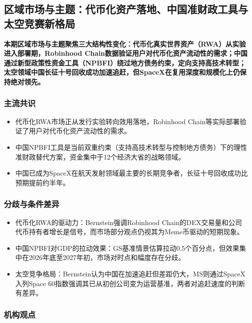 \documentclass[11pt]{ctexart}
\begin{document}
\subsection{区域市场与主题：代币化资产落地、中国准财政工具与太空竞赛新格局}
\textbf{本期区域市场与主题聚焦三大结构性变化：代币化真实世界资产（RWA）从实验进入部署期，Robinhood Chain数据验证用户对代币化资产流动性的需求；中国通过新型政策性资金工具（NPBFI）绕过地方债务约束，定向支持高技术转型；太空领域中国长征十号回收成功加速追赶，但SpaceX在复用深度和规模化上仍保持绝对领先。}
\subsubsection*{主流共识}
\begin{itemize}
  \item 代币化RWA市场正从发行实验转向效用落地，Robinhood Chain等实际部署验证了用户对代币化资产流动性的需求。
  \item 中国NPBFI工具是当前双重约束（支持高技术转型与控制地方债务）下的理性准财政替代方案，资金集中于12个经济大省的战略领域。
  \item 中国已成为SpaceX在航天发射领域最主要的长期竞争者，长征十号回收成功比预期提前约半年。
\end{itemize}
\subsubsection*{分歧与条件差异}
\begin{itemize}
  \item 代币化RWA的驱动力：Bernstein强调Robinhood Chain的DEX交易量和公司代币持有者增长是信号，而市场部分观点仍视其为Meme币驱动的短期现象。
  \item 中国NPBFI对GDP的拉动效果：GS基准情景估算拉动0.5个百分点，但效果集中在2026年底至2027年初，市场对时点和幅度存在分歧。
  \item 太空竞争格局：Bernstein认为中国在加速追赶但差距仍大，MS则通过SpaceX入列Space 60指数强调其已从初创公司变为运营基准，两者对追赶速度的判断有差异。
\end{itemize}
\subsubsection*{机构观点}
\end{document}
